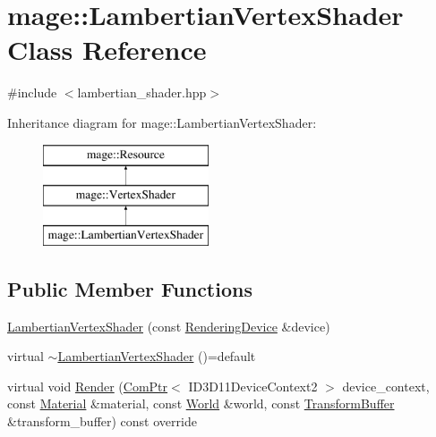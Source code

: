 \hypertarget{classmage_1_1_lambertian_vertex_shader}{}\section{mage\+:\+:Lambertian\+Vertex\+Shader Class Reference}
\label{classmage_1_1_lambertian_vertex_shader}


{\ttfamily \#include $<$lambertian\+\_\+shader.\+hpp$>$}

Inheritance diagram for mage\+:\+:Lambertian\+Vertex\+Shader\+:\begin{figure}[H]
\begin{center}
\leavevmode
\includegraphics[height=3.000000cm]{classmage_1_1_lambertian_vertex_shader}
\end{center}
\end{figure}
\subsection*{Public Member Functions}
\begin{DoxyCompactItemize}
\item 
\hyperlink{classmage_1_1_lambertian_vertex_shader_a96895a373639cf89d2fe4552203aeeda}{Lambertian\+Vertex\+Shader} (const \hyperlink{classmage_1_1_rendering_device}{Rendering\+Device} \&device)
\item 
virtual \hyperlink{classmage_1_1_lambertian_vertex_shader_a55636fd3817b97b6529690d6e3e5cd46}{$\sim$\+Lambertian\+Vertex\+Shader} ()=default
\item 
virtual void \hyperlink{classmage_1_1_lambertian_vertex_shader_a4011d368dfaf7d0202a4cfde052d390a}{Render} (\hyperlink{namespacemage_ae74f374780900893caa5555d1031fd79}{Com\+Ptr}$<$ I\+D3\+D11\+Device\+Context2 $>$ device\+\_\+context, const \hyperlink{structmage_1_1_material}{Material} \&material, const \hyperlink{classmage_1_1_world}{World} \&world, const \hyperlink{structmage_1_1_transform_buffer}{Transform\+Buffer} \&transform\+\_\+buffer) const override
\end{DoxyCompactItemize}
